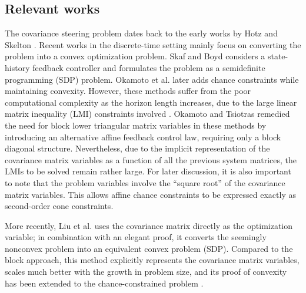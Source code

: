 \documentclass{IEEEtran}
\begin{document}
\subsection{Relevant works}
The covariance steering problem dates back to the early works by Hotz and Skelton \cite{hotzCovarianceControlTheory1987}. Recent works in the discrete-time setting mainly focus on converting the problem into a convex optimization problem. Skaf and Boyd \cite{skafDesignAffineControllers2010} considers a state-history feedback controller and formulates the problem as a semidefinite programming (SDP) problem. Okamoto et al. \cite{okamotoOptimalCovarianceControl2018} later adds chance constraints while maintaining convexity. However, these methods suffer from the poor computational complexity as the horizon length increases, due to the large linear matrix inequality (LMI) constraints involved \cite{rapakouliasDiscreteTimeOptimalCovariance2023}. Okamoto and Tsiotras \cite{okamotoOptimalStochasticVehicle2019} remedied the need for block lower triangular matrix variables in these methods by introducing an alternative affine feedback control law, requiring only a block diagonal structure. Nevertheless, due to the implicit representation of the covariance matrix variables as a function of all the previous system matrices, the LMIs to be solved remain rather large. For later discussion, it is also important to note that the problem variables involve the ``square root'' of the covariance matrix variables. This allows affine chance constraints to be expressed exactly as second-order cone constraints.

More recently, Liu et al. \cite{liuOptimalCovarianceSteering2025} uses the covariance matrix directly as the optimization variable; in combination with an elegant proof, it converts the seemingly nonconvex problem into an equivalent convex problem (SDP). Compared to the block approach, this method explicitly represents the covariance matrix variables, scales much better with the growth in problem size, and its proof of convexity has been extended to the chance-constrained problem \cite{rapakouliasDiscreteTimeOptimalCovariance2023}. 
\end{document}
